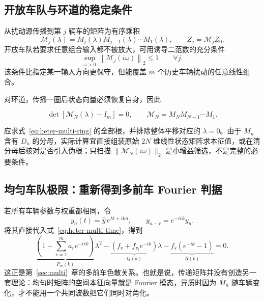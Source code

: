 \documentclass[11pt,a4paper,openany]{book}
\numberwithin{equation}{chapter}
\numberwithin{figure}{chapter}
\numberwithin{table}{chapter}
\begin{document}
\subsection{开放车队与环道的稳定条件}

从扰动源传播到第 $j$ 辆车的矩阵为有序乘积
\begin{equation}
\mathcal M_j(\lambda)=M_j(\lambda)M_{j-1}(\lambda)\cdots M_1(\lambda),
\qquad Z_j=\mathcal M_jZ_0.
\label{eq:heter-multi-prefix}
\end{equation}
开放车队若要求任意组合输入都不被放大，可用诱导二范数的充分条件
\begin{equation}
\sup_{\omega>0}\left\|\mathcal M_j(i\omega)\right\|_2\le1
\qquad \forall j.
\label{eq:heter-multi-open-condition}
\end{equation}
该条件比指定某一输入方向更保守，但能覆盖 $m$ 个历史车辆扰动的任意线性组合。

对环道，传播一圈后状态向量必须恢复自身，因此
\begin{tcolorbox}[keybox,title=\textbf{多前车异质环道的闭合方程}]
\begin{equation}
\det\!\left[\mathcal M_N(\lambda)-I_m\right]=0,
\qquad
\mathcal M_N=M_NM_{N-1}\cdots M_1.
\label{eq:heter-multi-ring}
\end{equation}
\end{tcolorbox}
应求式~\eqref{eq:heter-multi-ring} 的全部根，并排除整体平移对应的 $\lambda=0$。由于 $M_n$ 含有 $D_n$ 的分母，实际计算宜直接组装原始 $2N$ 维线性状态矩阵求本征值，或在清分母后核对是否引入伪根；只扫描 $\|\mathcal M_N(i\omega)\|_2$ 是小增益筛选，不是完整的必要条件。

\subsection{均匀车队极限：重新得到多前车 Fourier 判据}

若所有车辆参数与权重都相同，令
\[
y_n(t)=\widehat y\,e^{\lambda t+ikn},
\qquad y_{n-r}=e^{-irk}y_n.
\]
将其直接代入式~\eqref{eq:heter-multi-time}，得到
\begin{equation}
\underbrace{\left(1-\sum_{r=1}^{m}a_r e^{-irk}\right)}_{P_m(k)}\lambda^2
-\underbrace{\left(f_v+f_{v_l}e^{-ik}\right)}_{Q(k)}\lambda
-\underbrace{f_s\left(e^{-ik}-1\right)}_{R(k)}=0.
\label{eq:heter-multi-uniform-dispersion}
\end{equation}
这正是第~\ref{sec:multi}~章的多前车色散关系。也就是说，传递矩阵并没有创造另一套理论：均匀时矩阵的空间本征向量就是 Fourier 模态，异质时因为 $M_n$ 随车辆变化，才不能用一个共同波数把它们同时对角化。
\end{document}

